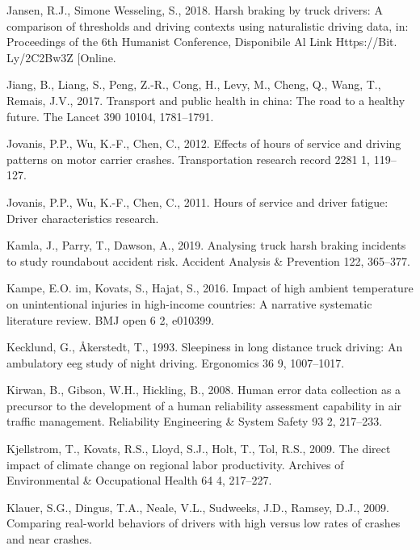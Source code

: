 \documentclass[12pt]{book}
\numberwithin{equation}{chapter}
\begin{document}
\leavevmode\hypertarget{ref-jansen2018harsh}{}%
Jansen, R.J., Simone Wesseling, S., 2018. Harsh braking by truck drivers: A comparison of thresholds and driving contexts using naturalistic driving data, in: Proceedings of the 6th Humanist Conference, Disponibile Al Link Https://Bit. Ly/2C2Bw3Z {[}Online.

\leavevmode\hypertarget{ref-jiang2017transport}{}%
Jiang, B., Liang, S., Peng, Z.-R., Cong, H., Levy, M., Cheng, Q., Wang, T., Remais, J.V., 2017. Transport and public health in china: The road to a healthy future. The Lancet 390 10104, 1781--1791.

\leavevmode\hypertarget{ref-jovanis2012effects}{}%
Jovanis, P.P., Wu, K.-F., Chen, C., 2012. Effects of hours of service and driving patterns on motor carrier crashes. Transportation research record 2281 1, 119--127.

\leavevmode\hypertarget{ref-jovanis2011hours}{}%
Jovanis, P.P., Wu, K.-F., Chen, C., 2011. Hours of service and driver fatigue: Driver characteristics research.

\leavevmode\hypertarget{ref-kamla2019analysing}{}%
Kamla, J., Parry, T., Dawson, A., 2019. Analysing truck harsh braking incidents to study roundabout accident risk. Accident Analysis \& Prevention 122, 365--377.

\leavevmode\hypertarget{ref-im2016impact}{}%
Kampe, E.O. im, Kovats, S., Hajat, S., 2016. Impact of high ambient temperature on unintentional injuries in high-income countries: A narrative systematic literature review. BMJ open 6 2, e010399.

\leavevmode\hypertarget{ref-kecklund1993sleepiness}{}%
Kecklund, G., Åkerstedt, T., 1993. Sleepiness in long distance truck driving: An ambulatory eeg study of night driving. Ergonomics 36 9, 1007--1017.

\leavevmode\hypertarget{ref-kirwan2008human}{}%
Kirwan, B., Gibson, W.H., Hickling, B., 2008. Human error data collection as a precursor to the development of a human reliability assessment capability in air traffic management. Reliability Engineering \& System Safety 93 2, 217--233.

\leavevmode\hypertarget{ref-kjellstrom2009direct}{}%
Kjellstrom, T., Kovats, R.S., Lloyd, S.J., Holt, T., Tol, R.S., 2009. The direct impact of climate change on regional labor productivity. Archives of Environmental \& Occupational Health 64 4, 217--227.

\leavevmode\hypertarget{ref-klauer2009comparing}{}%
Klauer, S.G., Dingus, T.A., Neale, V.L., Sudweeks, J.D., Ramsey, D.J., 2009. Comparing real-world behaviors of drivers with high versus low rates of crashes and near crashes.
\end{document}
